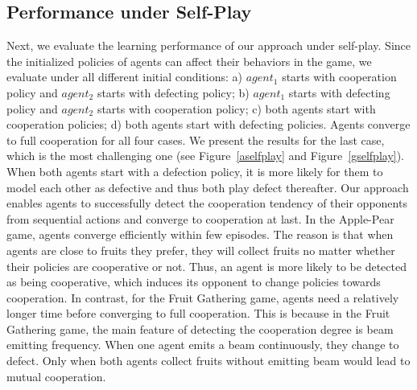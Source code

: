 \documentclass{article}
\begin{document}
\subsection{Performance under Self-Play}
Next, we evaluate the learning performance of our approach under self-play. Since the initialized policies of agents can affect their behaviors in the game, we evaluate under all different initial conditions: a) $agent_1$ starts with cooperation policy and $agent_2$ starts with defecting policy; b) $agent_1$ starts with defecting policy and $agent_2$ starts with cooperation policy; c) both agents start with cooperation policies; d) both agents start with defecting policies. Agents converge to full cooperation for all four cases. We present the results for the last case, which is the most challenging one (see Figure~\ref{aselfplay} and Figure~\ref{gselfplay}).
When both agents start with a defection policy, it is more likely for them to model each other as defective and thus both play defect thereafter. Our approach enables agents to successfully detect the cooperation tendency of their opponents from sequential actions and converge to cooperation at last. In the Apple-Pear game, agents converge efficiently within few episodes. The reason is that when agents are close to fruits they prefer, they will collect fruits no matter whether their policies are cooperative or not. Thus, an agent is more likely to be detected as being cooperative, which induces its opponent to change policies towards cooperation. In contrast, for the Fruit Gathering game, agents need a relatively longer time before converging to full cooperation. This is because in the Fruit Gathering game, the main feature of detecting the cooperation degree is beam emitting frequency. When one agent emits a beam continuously, they change to defect. Only when both agents collect fruits without emitting beam would lead to mutual cooperation.
\end{document}
